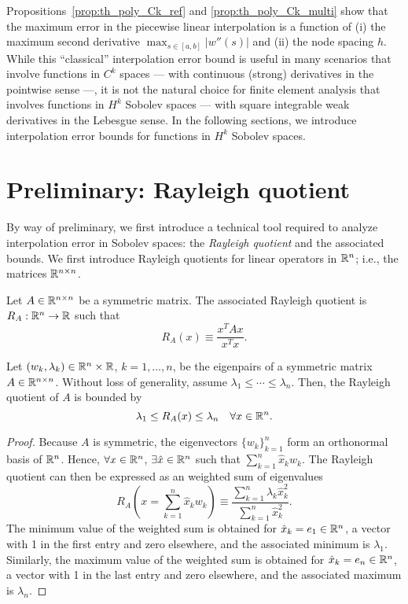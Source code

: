 Propositions~\ref{prop:th_poly_Ck_ref} and \ref{prop:th_poly_Ck_multi} show that the maximum error in the piecewise linear interpolation is a function of (i) the maximum second derivative $\max_{s \in [a,b]} | w''(s)|$ and (ii) the node spacing $h$.  While this ``classical'' interpolation error bound is useful in many scenarios that involve functions in $C^k$ spaces --- with continuous (strong) derivatives in the pointwise sense  ---, it is not the natural choice for finite element analysis that involves functions in $H^k$ Sobolev spaces --- with square integrable weak derivatives in the Lebesgue sense.  In the following sections, we introduce interpolation error bounds for functions in $H^k$ Sobolev spaces.

\section{Preliminary: Rayleigh quotient}
By way of preliminary, we first introduce a technical tool required to analyze interpolation error in Sobolev spaces: the \emph{Rayleigh quotient} and the associated bounds.  We first introduce Rayleigh quotients for linear operators in $\mathbb{R}^n$; i.e., the matrices $\mathbb{R}^{n \times n}$.
\begin{definition}
  Let $A \in \mathbb{R}^{n \times n}$ be a symmetric matrix.  The associated Rayleigh quotient is $R_A: \mathbb{R}^n \to \mathbb{R}$ such that
  \begin{equation*}
    R_A(x) \equiv \frac{x^T A x}{x^T x}.
  \end{equation*}
\end{definition}
\begin{proposition}
  Let $(w_k,\lambda_k) \in \mathbb{R}^n \times \mathbb{R}$, $k = 1,\dots,n$, be the eigenpairs of a symmetric matrix $A \in \mathbb{R}^{n \times n}$.  Without loss of generality, assume $\lambda_1 \leq \cdots \leq \lambda_n$. Then, the Rayleigh quotient of $A$ is bounded by
  \begin{equation*}
    \lambda_1 \leq R_A(x) \leq \lambda_n \quad \forall x \in \mathbb{R}^n.
  \end{equation*}
  \begin{proof}
    Because $A$ is symmetric, the eigenvectors $\{w_k\}_{k=1}^n$ form an orthonormal basis of $\mathbb{R}^n$.  Hence, $\forall x \in \mathbb{R}^n$, $\exists \hat x \in \mathbb{R}^n$ such that $\sum_{k=1}^n \hat x_k w_k$.  The Rayleigh quotient can then be expressed as an weighted sum of eigenvalues
    \begin{equation*}
      R_A(x = \sum_{k=1}^n \hat x_k w_k) \equiv \frac{\sum_{k=1}^n \lambda_k \hat x_k^2}{\sum_{k=1}^n \hat x_k^2}.
    \end{equation*}
    The minimum value of the weighted sum is obtained for $\hat x_k = e_1 \in \mathbb{R}^n$, a vector with 1 in the first entry and zero elsewhere, and the associated minimum is $\lambda_1$.  Similarly, the maximum value of the weighted sum is obtained for $\hat x_k = e_n \in \mathbb{R}^n$, a vector with 1 in the last entry and zero elsewhere, and the associated maximum is $\lambda_n$.
  \end{proof}
\end{proposition}

